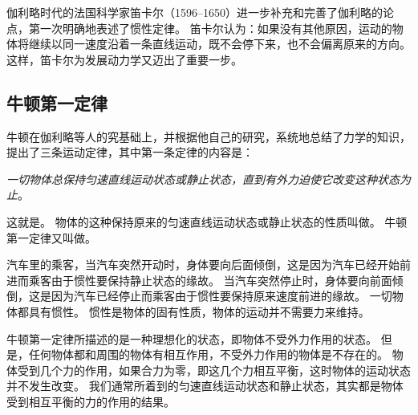 伽利略时代的法国科学家笛卡尔（1596--1650）进一步补充和完善了伽利略的论点，第一次明确地表述了惯性定律。
笛卡尔认为：如果没有其他原因，运动的物体将继续以同一速度沿着一条直线运动，既不会停下来，也不会偏离原来的方向。
这样，笛卡尔为发展动力学又迈出了重要一步。

\subsection{牛顿第一定律} 
牛顿在伽利略等人的究基础上，并根据他自己的研究，系统地总结了力学的知识，提出了三条运动定律，其中第一条定律的内容是：

\emph{一切物体总保持匀速直线运动状态或静止状态，直到有外力迫使它改变这种状态为止}。

这就是。
物体的这种保持原来的匀速直线运动状态或静止状态的性质叫做。
牛顿第一定律又叫做。

汽车里的乘客，当汽车突然开动时，身体要向后面倾倒，这是因为汽车已经开始前进而乘客由于惯性要保持静止状态的缘故。
当汽车突然停止时，身体要向前面倾倒，这是因为汽车已经停止而乘客由于惯性要保持原来速度前进的缘故。
一切物体都具有惯性。
惯性是物体的固有性质，物体的运动并不需要力来维持。

牛顿第一定律所描述的是一种理想化的状态，即物体不受外力作用的状态。
但是，任何物体都和周围的物体有相互作用，不受外力作用的物体是不存在的。
物体受到几个力的作用，如果合力为零，即这几个力相互平衡，这时物体的运动状态并不发生改变。
我们通常所着到的匀速直线运动状态和静止状态，其实都是物体受到相互平衡的力的作用的结果。

